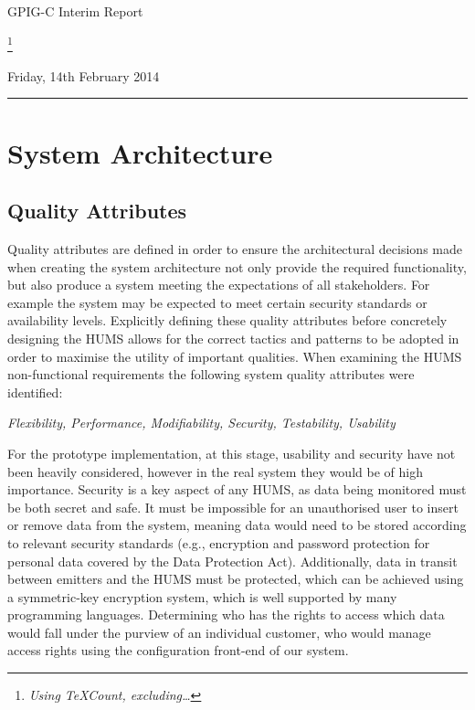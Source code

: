 \documentclass[10pt,a4paper]{article}
\begin{document}
\begin{center}
{\Large GPIG-C Interim Report}

\footnote{\textit{Using TeXCount, excluding\ldots}} %

Friday, 14th February 2014
\end{center}

\vspace{0.3cm}
\rule{\textwidth}{0.4pt}




\section{System Architecture}
\label{sec:architecture}

\subsection{Quality Attributes}
\label{sec:architecture-quality}

Quality attributes are defined in order to ensure the architectural decisions 
made when creating the system architecture not only provide the required 
functionality, but also produce a system meeting the expectations of all 
stakeholders. For example the system may be expected to meet certain 
security standards or availability levels. Explicitly defining these quality 
attributes before concretely designing the HUMS allows for the correct 
tactics and patterns to be adopted in order to maximise the utility of important 
qualities. When examining the HUMS non-functional requirements the 
following system quality attributes were identified:
	\begin{center}
	\textit{Flexibility, Performance, Modifiability, Security, 
Testability, Usability}
	\end{center}
For the prototype implementation, at this stage, usability and security 
have not been heavily considered, however in the real system they 
would be of high importance. Security is a key aspect of any HUMS, 
as data being monitored must be both secret and safe. It must be impossible 
for an unauthorised user to insert or remove data from the system, meaning data would need to be stored according to relevant security standards 
(e.g., encryption and password protection for personal data covered by the 
Data Protection Act). Additionally, data in transit between emitters and the HUMS must be protected, which can be achieved using a symmetric-key 
encryption system, which is well supported by many programming languages. 
Determining who has the rights to access which data would fall under the 
purview of an individual customer, who would manage access rights using the 
configuration front-end of our system.
\end{document}
